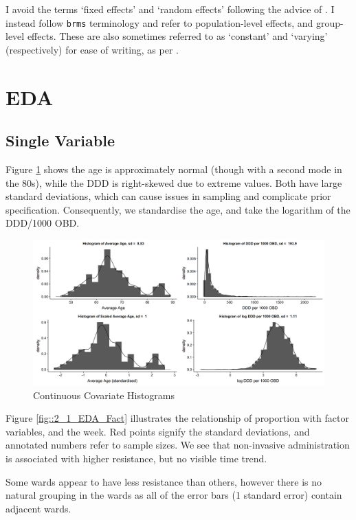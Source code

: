 \documentclass[11pt,twoside]{article}
\numberwithin{Theorem}{section}
\numberwithin{Definition}{section}
\numberwithin{Lemma}{section}
\numberwithin{Algorithm}{section}
\numberwithin{equation}{section}
\begin{document}
I avoid the terms `fixed effects' and `random effects' following the advice of \cite{GelmanHill2007}. I instead follow \texttt{brms} terminology and refer to population-level effects, and group-level effects. These are also sometimes referred to as `constant' and `varying' (respectively) for ease of writing, as per \cite{Gelman2005}.

\newpage
\section{EDA} \label{sec::EDA}

\subsection{Single Variable} \label{sec::EDA_1}

Figure \ref{fig::2_1_EDA_Cont} shows the age is approximately normal (though with a second mode in the 80s), while the DDD is right-skewed due to extreme values. Both have large standard deviations, which can cause issues in sampling and complicate prior specification. Consequently, we standardise the age, and take the logarithm of the DDD/1000 OBD. 

\begin{figure}[h]
\centering
\includegraphics[width=\textwidth]{Figures/2_1_EDA_Cont.png}
\caption{Continuous Covariate Histograms} \label{fig::2_1_EDA_Cont}
\end{figure}

Figure \ref{fig::2_1_EDA_Fact} illustrates the relationship of proportion with factor variables, and the week. Red points signify the standard deviations, and annotated numbers refer to sample sizes. We see that non-invasive administration is associated with higher resistance, but no visible time trend.  

Some wards appear to have less resistance than others, however there is no natural grouping in the wards as all of the error bars (1 standard error) contain adjacent wards. 
\end{document}
